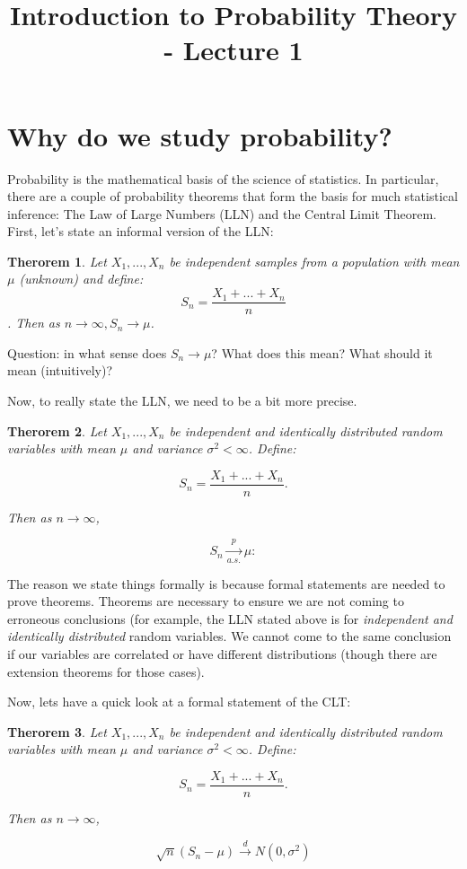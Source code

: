 \documentclass[12pt]{article} %
\date{}
\title{Introduction to Probability Theory - Lecture 1}
\newtheorem{thm}{Therorem}
\begin{document}
\maketitle
\section{Why do we study probability?}
Probability is the mathematical basis of the science of statistics. In particular, there are a couple of probability theorems that form the basis for much statistical inference: The Law of Large Numbers (LLN) and the Central Limit Theorem.\\

First, let's state an informal version of the LLN:\\

\begin{thm}
Let $X_1,...,X_n$ be independent samples from a population with mean $\mu$ (unknown) and define:
$$S_n = \frac{X_1+...+X_n}n$$.
Then as $n\rightarrow\infty, S_n\rightarrow\mu$.
\end{thm}
Question: in what sense does $S_n\rightarrow\mu$? What does this mean? What should it mean (intuitively)? 

Now, to really state the LLN, we need to be a bit more precise. \\
\begin{thm}
Let $X_1,...,X_n$ be independent and identically distributed random variables with mean $\mu$ and variance $\sigma^2<\infty$. Define:

$$S_n=\frac{X_1+...+X_n}{n}.$$

Then as $n\rightarrow\infty$, 

$$S_n\xrightarrow[a.s.]{p}\mu:$$
\end{thm}
The reason we state things formally is because formal statements are needed to prove theorems. Theorems are necessary to ensure we are not coming to erroneous conclusions (for example, the LLN stated above is for \emph{independent and identically distributed} random variables. We cannot come to the same conclusion if our variables are correlated or have different distributions (though there are extension theorems for those cases).

Now, lets have a quick look at a formal statement of the CLT:

\begin{thm}
Let $X_1,...,X_n$ be independent and identically distributed random variables with mean $\mu$ and variance $\sigma^2<\infty$. Define:

$$S_n=\frac{X_1+...+X_n}{n}.$$

Then as $n\rightarrow\infty$, 

$$\sqrt{n}\left(S_n-\mu\right)\xrightarrow{d} N(0,\sigma^2)$$
\end{thm}
\end{document}
